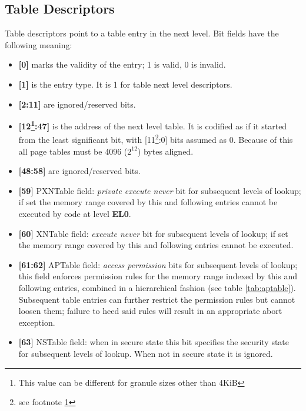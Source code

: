 \documentclass[12pt,a4paper,openright,twoside]{report}
\begin{document}
\subsection{Table Descriptors}
Table descriptors point to a table entry in the next level. Bit fields have the 
following meaning:
\begin{itemize}
    \item \textbf{[0]} marks the validity of the entry; 1 is valid, 0 is invalid.
    \item \textbf{[1]} is the entry type. It is 1 for table next level descriptors.
    \item \textbf{[2:11]} are ignored/reserved bits.
    \item \textbf{[12\footnote{\label{4knote} This value can be different for granule
        sizes other than 4KiB}:47]} is the address of the next level table. It is codified
        as if it started from the least significant bit, with 
        [11\footnote{see footnote \ref{4knote}}:0] bits assumed
        as 0. Because of this all page tables must be 4096 ($2^{12}$) bytes aligned.
    \item \textbf{[48:58]} are ignored/reserved bits.
    \item \textbf{[59]} PXNTable field: \textit{private execute never} bit for subsequent
        levels of lookup; if set the memory range covered by this and following entries
        cannot be executed by code at level \textbf{EL0}.
    \item \textbf{[60]} XNTable field: \textit{execute never} bit for subsequent levels
        of lookup; if set the memory range covered by this and following entries
        cannot be executed.
    \item \textbf{[61:62]} APTable field: \textit{access permission} bits for subsequent levels
        of lookup; this field enforces permission rules for the memory range
        indexed by this and following entries, combined in a hierarchical 
        fashion (see table \ref{tab:aptable}). Subsequent table entries can
        further restrict the permission rules but cannot loosen them; failure
        to heed said rules will result in an appropriate abort exception.
    \item \textbf{[63]} NSTable field: when in secure state this bit specifies
        the security state for subsequent levels of lookup. When not in secure state
        it is ignored.
\end{itemize}
\end{document}
